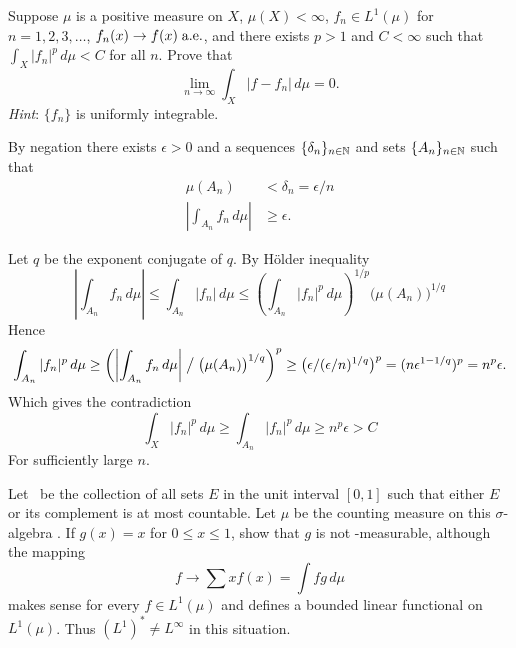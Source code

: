 \begin{enumerate}
\begin{excopy}
Suppose \(\mu\) is a positive measure on $X$, \(\mu(X)<\infty\),
\(f_n \in L^1(\mu)\) for \(n=1,2,3,\ldots\),
\(f_n(x)\to f(x)\;\textrm{a.e.}\),
and there exists \(p>1\) and \(C<\infty\) such that
\(\int_X |f_n|^p\,d\mu<C\) for all $n$. Prove that
\begin{equation*}
\lim_{n\to\infty} \int_X |f - f_n|\,d\mu = 0.
\end{equation*}
\emph{Hint}: \(\{f_n\}\) is uniformly integrable.
\end{excopy}

By negation there exists \(\epsilon>0\) and 
a sequences \(\{\delta_n\}_{n\in\mathbb{N}}\) and sets \(\{A_n\}_{n\in\mathbb{N}}\)
such that 
\begin{align*}
\mu(A_n) &< \delta_n = \epsilon/n \\
\left|\int_{A_n} f_n\,d\mu \right| &\geq \epsilon.
\end{align*}

Let $q$ be the exponent conjugate of $q$.
By H\"older inequality
\begin{equation*}
\left|\int_{A_n} f_n\,d\mu \right|
\leq \int_{A_n} |f_n|\,d\mu 
\leq 
\iffalse
     \left(\int_{A_n} |f_n|^p\,d\mu\right)^{1/p}
     \left(\int_{A_n} 1^q\,d\mu\right)^{1/q}
= 
\fi
\left(\int_{A_n} |f_n|^p\,d\mu\right)^{1/p} \bigl(\mu(A_n)\bigr)^{1/q}
\end{equation*}
Hence
\begin{equation*}
\int_{A_n} |f_n|^p\,d\mu
\geq \left( 
      \left|\int_{A_n} f_n\,d\mu \right| \bigm/ \bigl(\mu(A_n)\bigr)^{1/q}
     \right)^p
\geq \bigl( \epsilon / (\epsilon/n)^{1/q} \bigr)^p 
= (n\epsilon^{1-1/q})^p
= n^p\epsilon.
\end{equation*}
Which gives the contradiction
\begin{equation*}
\int_X |f_n|^p\,d\mu \geq \int_{A_n} |f_n|^p\,d\mu \geq n^p\epsilon > C
\end{equation*}
For sufficiently large $n$.


\begin{excopy}
Let \frakM\ be the collection of all sets $E$ in the unit interval \([0,1]\) such that either $E$ or its complement is at most countable.
Let \(\mu\) be the counting measure on this \(\sigma\)-algebra \frakM.
If \(g(x) = x\) for \(0\leq x \leq 1\),
show that $g$ is not \frakM-measurable, although the mapping
\begin{equation*}
f \to \sum xf(x) = \int fg\,d\mu
\end{equation*}
makes sense for every \(f\in L^1(\mu)\) and defines a bounded linear functional
on \(L^1(\mu)\). Thus \((L^1)^* \neq L^\infty\) in this situation.
\end{excopy}


\end{enumerate}
